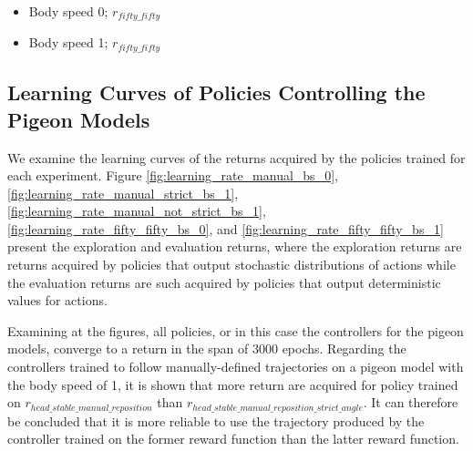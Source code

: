 \begin{itemize}
    \item Body speed 0; $r_{fifty\_fifty}$

    \item Body speed 1; $r_{fifty\_fifty}$

  \end{itemize}

\subsection{Learning Curves of Policies Controlling the Pigeon Models}
  We examine the learning curves of the returns acquired by the policies trained for each experiment.
  Figure \ref{fig:learning_rate_manual_bs_0}, \ref{fig:learning_rate_manual_strict_bs_1}, \ref{fig:learning_rate_manual_not_strict_bs_1}, \ref{fig:learning_rate_fifty_fifty_bs_0}, and \ref{fig:learning_rate_fifty_fifty_bs_1} present the exploration and evaluation returns, where the exploration returns are returns acquired by policies that output stochastic distributions of actions while the evaluation returns are such acquired by policies that output deterministic values for actions.

  Examining at the figures, all policies, or in this case the controllers for the pigeon models, converge to a return in the span of 3000 epochs.
  Regarding the controllers trained to follow manually-defined trajectories on a pigeon model with the body speed of 1, it is shown that more return are acquired for policy trained on $r_{head\_stable\_manual\_reposition}$ than $r_{head\_stable\_manual\_reposition\_strict\_angle}$.
  It can therefore be concluded that it is more reliable to use the trajectory produced by the controller trained on the former reward function than the latter reward function.

